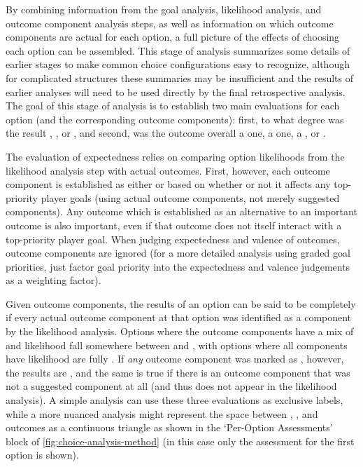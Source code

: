 By combining information from the goal analysis, likelihood analysis, and outcome component analysis steps, as well as information on which outcome components are actual for each option, a full picture of the effects of choosing each option can be assembled.
%
This stage of analysis summarizes some details of earlier stages to make common choice configurations easy to recognize, although for complicated structures these summaries may be insufficient and the results of earlier analyses will need to be used directly by the final retrospective analysis.
%
The goal of this stage of analysis is to establish two main evaluations for each option (and the corresponding outcome components): first, to what degree was the result , , or , and second, was the outcome overall a  one, a  one, a , or .


The evaluation of expectedness relies on comparing option likelihoods from the likelihood analysis step with actual outcomes.
%
First, however, each outcome component is established as either  or  based on whether or not it affects any top-priority player goals (using actual outcome components, not merely suggested components).
%
Any outcome which is established as an alternative to an important outcome is also important, even if that outcome does not itself interact with a top-priority player goal.
%
When judging expectedness and valence of outcomes,  outcome components are ignored (for a more detailed analysis using graded goal priorities, just factor goal priority into the expectedness and valence judgements as a weighting factor).


Given  outcome components, the results of an option can be said to be completely  if every  actual outcome component at that option was identified as a  component by the likelihood analysis.
%
Options where the  outcome components have a mix of  and  likelihood fall somewhere between  and , with options where all  components have  likelihood are fully .
%
If \emph{any}  outcome component was marked as , however, the results are , and the same is true if there is an  outcome component that was not a suggested component at all (and thus does not appear in the likelihood analysis).
%
A simple analysis can use these three evaluations as exclusive labels, while a more nuanced analysis might represent the space between , , and  outcomes as a continuous triangle as shown in the `Per-Option Assessments' block of \cref{fig:choice-analysis-method} (in this case only the assessment for the first option is shown).


